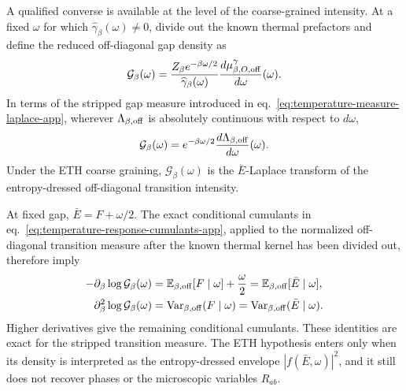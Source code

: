 \documentclass[a4paper,11pt]{article}
\def\dd{d}%
\def\ee{e}%
\theoremstyle{definition}
\theoremstyle{remark}
\newcommand{\dd}{\mathrm d}
\newcommand{\ee}{\mathrm e}
\begin{document}
A qualified converse is available at the level of the coarse-grained intensity.  At a fixed
$\omega$ for which $\widehat\gamma_\beta(\omega)\ne0$, divide out the known thermal prefactors and
define the reduced off-diagonal gap density as
\begin{equation}
   \mathcal G_\beta(\omega)
   =\frac{Z_\beta\ee^{-\beta\omega/2}}
           {\widehat\gamma_\beta(\omega)}
      \frac{\dd\mu^\gamma_{\beta,O,{\rm off}}}{\dd\omega}(\omega).
   \label{eq:thermal-gap-Laplace-data-app}
\end{equation}
In terms of the
stripped gap measure introduced in eq.~\eqref{eq:temperature-measure-laplace-app}, wherever
$\Lambda_{\beta,{\rm off}}$ is absolutely continuous with respect to $\dd\omega$,
\begin{equation}
   \mathcal G_\beta(\omega)
   =\ee^{-\beta\omega/2}
     \frac{\dd\Lambda_{\beta,{\rm off}}}{\dd\omega}(\omega).
   \label{eq:eth-exact-temperature-relation-app}
\end{equation}
Under the ETH coarse graining, $\mathcal G_\beta(\omega)$ is the $\bar E$-Laplace transform of
the entropy-dressed off-diagonal transition intensity.

At fixed gap, $\bar E=F+\omega/2$.  The exact conditional cumulants in
eq.~\eqref{eq:temperature-response-cumulants-app}, applied to the normalized off-diagonal
transition measure after the known thermal kernel has been divided out,
therefore imply
\begin{equation}
\begin{aligned}
   -\partial_\beta\log\mathcal G_\beta(\omega)
   &=\mathbb E_{\beta,{\rm off}}[F\mid\omega]+\frac{\omega}{2}
    =\mathbb E_{\beta,{\rm off}}[\bar E\mid\omega],\\
   \partial_\beta^2\log\mathcal G_\beta(\omega)
   &=\operatorname{Var}_{\beta,{\rm off}}(F\mid\omega)
    =\operatorname{Var}_{\beta,{\rm off}}(\bar E\mid\omega).
\end{aligned}
   \label{eq:thermal-gap-response-cumulants-app}
\end{equation}
Higher derivatives give the remaining conditional cumulants.  These identities are exact for
the stripped transition measure.  The ETH hypothesis enters only when its density is interpreted
as the entropy-dressed envelope $|f(\bar E,\omega)|^2$, and it still does not recover phases or the
microscopic variables $R_{ab}$.
\end{document}
